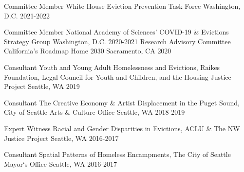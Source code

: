 \begin{cvhonors}

  \cvhonor
    {Committee Member} %
    {White House Eviction Prevention Task Force} %
    {Washington, D.C.} %
    {2021-2022} %
    
  \cvhonor
    {Committee Member} %
    {National Academy of Sciences' COVID-19 \& Evictions Strategy Group} %
    {Washington, D.C.} %
    {2020-2021} %
  \cvhonor
    {Research Advisory Committee} %
    {California's Roadmap Home 2030} %
    {Sacramento, CA} %
    {2020} %
    
  \cvhonor
    {Consultant} %
    {Youth and Young Adult Homelessness and Evictions, Raikes Foundation, Legal Council for Youth and Children, and the Housing Justice Project} %
    {Seattle, WA} %
    {2019} %

  \cvhonor
    {Consultant} %
    {The Creative Economy \& Artist Displacement in the Puget Sound, City of Seattle Arts \& Culture Office} %
    {Seattle, WA} %
    {2018-2019} %

  \cvhonor
    {Expert Witness} %
    {Racial and Gender Disparities in Evictions, ACLU \& The NW Justice Project} %
    {Seattle, WA} %
    {2016-2017} %

  \cvhonor
    {Consultant} %
    {Spatial Patterns of Homeless Encampments, The City of Seattle Mayor‘s Office} %
    {Seattle, WA} %
    {2016-2017} %

\end{cvhonors}